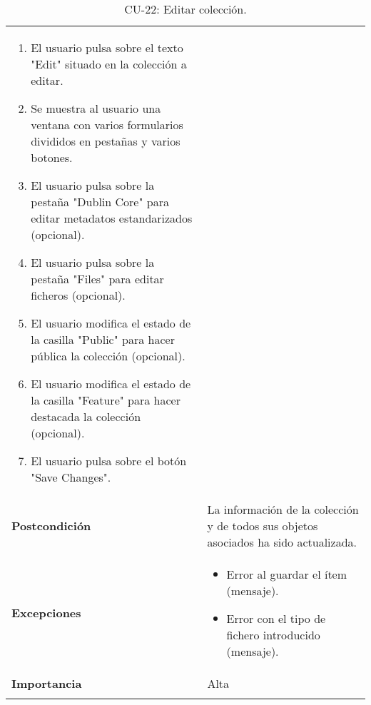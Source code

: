 \begin{longtable}[]{@{}ll@{}}
\begin{minipage}[t]{0.75\columnwidth}
\begin{enumerate}
\tightlist
\item
  El usuario pulsa sobre el texto "Edit" situado en la colección a
  editar.
\item
  Se muestra al usuario una ventana con varios formularios divididos en
  pestañas y varios botones.
\item
  El usuario pulsa sobre la pestaña "Dublin Core" para editar metadatos
  estandarizados (opcional).
\item
  El usuario pulsa sobre la pestaña "Files" para editar ficheros
  (opcional).
\item
  El usuario modifica el estado de la casilla "Public" para hacer
  pública la colección (opcional).
\item
  El usuario modifica el estado de la casilla "Feature" para hacer
  destacada la colección (opcional).
\item
  El usuario pulsa sobre el botón "Save Changes".
\end{enumerate}\strut
\end{minipage}\tabularnewline
\begin{minipage}[t]{0.19\columnwidth}\raggedright
\textbf{Postcondición}\strut
\end{minipage} & \begin{minipage}[t]{0.75\columnwidth}\raggedright
La información de la colección y de todos sus objetos asociados ha sido
actualizada.\strut
\end{minipage}\tabularnewline
\begin{minipage}[t]{0.19\columnwidth}\raggedright
\textbf{Excepciones}\strut
\end{minipage} & \begin{minipage}[t]{0.75\columnwidth}\raggedright
\begin{itemize}
\tightlist
\item
  Error al guardar el ítem (mensaje).
\item
  Error con el tipo de fichero introducido (mensaje).
\end{itemize}\strut
\end{minipage}\tabularnewline
\begin{minipage}[t]{0.19\columnwidth}\raggedright
\textbf{Importancia}\strut
\end{minipage} & \begin{minipage}[t]{0.75\columnwidth}\raggedright
Alta\strut
\end{minipage}\tabularnewline
\bottomrule
\caption{CU-22: Editar colección.}
\end{longtable}

